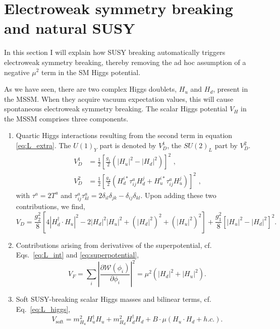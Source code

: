 \section{Electroweak symmetry breaking and natural SUSY  \label{sec:susy_EWbreaking}}

In this section I will explain how SUSY breaking automatically triggers electroweak symmetry
breaking, thereby removing the ad hoc assumption of a negative $\mu^2$ term in the SM Higgs
potential. 

As we have seen, there are two complex Higgs doublets, $H_u$ and $H_d$, present in the MSSM. 
When they acquire vacuum expectation values, this will cause spontaneous electroweak symmetry
breaking. The scalar Higgs potential $V_H$ in the MSSM comprises three components.  

\begin{enumerate}
  \item Quartic Higgs interactions resulting from the second term in equation \ref{eq:L_extra}. The
$U(1)_Y$ part is denoted by $V_D^1$, the $SU(2)_L$ part by $V_D^2$. 
  \begin{align}
  V_D^1 &= \frac{1}{2} \left[ \frac{g_1}{2} \left( |H_u|^2 - |H_d|^2 \right) \right]^2 \textrm{ ,}\\
  V_D^2 &= \frac{1}{2} \left[ \frac{g_2}{2} \left( H_d^{i*}\tau_{ij}^aH_d^j +
H_u^{i*}\tau_{ij}^aH_u^j \right) \right]^2 \textrm{ ,}
\end{align}
with $\tau^a = 2 T^a$ and $\tau_{ij}^a \tau_{kl}^a = 2\delta_{il}\delta_{jk} -
\delta_{ij}\delta_{kl}$. 
Upon adding these two contributions, we find,
\begin{equation}
  V_D = \frac{g^2_2}{8} \left[ 4|H_d^\dagger \cdot H_u|^2 - 2|H_d|^2|H_u|^2 + (|H_d|^2)^2 +
(|H_u|^2)^2 \right] + \frac{g^2_1}{8} \left[ |H_u|^2 - |H_d|^2 \right]^2 .
\end{equation}

\item Contributions arising from derivatives of the superpotential, cf. Eqs.~\ref{eq:L_int} and
\ref{eq:superpotential},
\begin{equation}
  V_F = \sum_i \left| \frac{\partial \mathcal{W}(\phi_i)}{\partial \phi_i} \right|^2 = \mu^2
\left(|H_d|^2 + |H_u|^2\right).
\end{equation}

\item Soft SUSY-breaking scalar Higgs masses and bilinear terms, cf. Eq.~\ref{eq:L_higgs}, 
\begin{equation}
  V_\textrm{soft} = m^2_{H_u} H_u^\dagger H_u + m^2_{H_d} H_d^\dagger H_d + B \cdot \mu (H_u \cdot
H_d + h.c.) .
\end{equation}

\end{enumerate}
